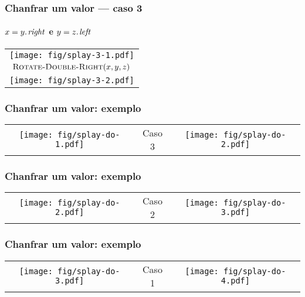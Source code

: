 \documentclass{beamer}
\begin{document}
\begin{frame}
\frametitle{Chanfrar um valor --- caso 3}
\framesubtitle{$x = \attrib{y}{right}$ e $y = \attrib{z}{left}$}

\begin{tabular}{c}
\texttt{[image: fig/splay-3-1.pdf]} \\
$\textnormal{\scshape Rotate-Double-Right}(x, y, z)$ \\
\texttt{[image: fig/splay-3-2.pdf]}
\end{tabular}

\end{frame}

\begin{frame}
\frametitle{Chanfrar um valor: exemplo}

\begin{tabular}[t]{ccc}
\texttt{[image: fig/splay-do-1.pdf]} &
Caso 3 &
\texttt{[image: fig/splay-do-2.pdf]}
\end{tabular}

\end{frame}

\begin{frame}
\frametitle{Chanfrar um valor: exemplo}

\begin{tabular}[t]{ccc}
\texttt{[image: fig/splay-do-2.pdf]} &
Caso 2 &
\texttt{[image: fig/splay-do-3.pdf]}
\end{tabular}

\end{frame}

\begin{frame}
\frametitle{Chanfrar um valor: exemplo}

\begin{tabular}[t]{ccc}
\texttt{[image: fig/splay-do-3.pdf]} &
Caso 1 &
\texttt{[image: fig/splay-do-4.pdf]}
\end{tabular}

\end{frame}
\end{document}
